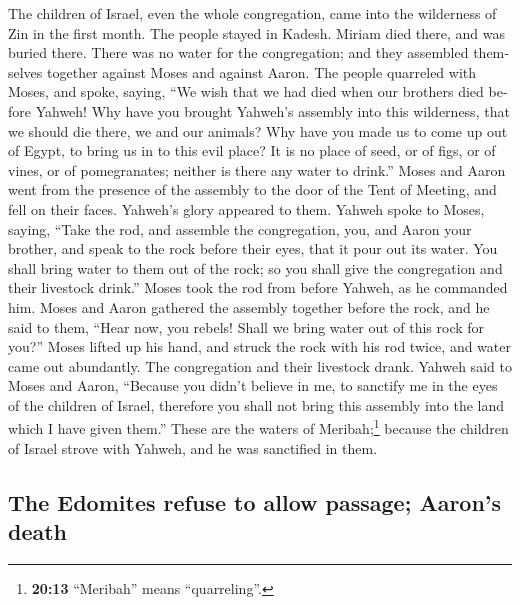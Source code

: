 \begin{paracol}{2}
\begin{otherlanguage}{english}
 The children of Israel, even the whole congregation, came
into the wilderness of Zin in the first month. The people stayed in
Kadesh. Miriam died there, and was buried there.  There
was no water for the congregation; and they assembled themselves
together against Moses and against Aaron.  The people
quarreled with Moses, and spoke, saying, ``We wish that we had died when
our brothers died before Yahweh!  Why have you brought
Yahweh's assembly into this wilderness, that we should die there, we and
our animals?  Why have you made us to come up out of
Egypt, to bring us in to this evil place? It is no place of seed, or of
figs, or of vines, or of pomegranates; neither is there any water to
drink.''  Moses and Aaron went from the presence of the
assembly to the door of the Tent of Meeting, and fell on their faces.
Yahweh's glory appeared to them.  Yahweh spoke to Moses,
saying,  ``Take the rod, and assemble the congregation,
you, and Aaron your brother, and speak to the rock before their eyes,
that it pour out its water. You shall bring water to them out of the
rock; so you shall give the congregation and their livestock drink.''
 Moses took the rod from before Yahweh, as he commanded
him.  Moses and Aaron gathered the assembly together
before the rock, and he said to them, ``Hear now, you rebels! Shall we
bring water out of this rock for you?''  Moses lifted up
his hand, and struck the rock with his rod twice, and water came out
abundantly. The congregation and their livestock drank. 
Yahweh said to Moses and Aaron, ``Because you didn't believe in me, to
sanctify me in the eyes of the children of Israel, therefore you shall
not bring this assembly into the land which I have given them.''
 These are the waters of Meribah;\footnote{\textbf{20:13}
  ``Meribah'' means ``quarreling''.} because the children of Israel
strove with Yahweh, and he was sanctified in them.

\hypertarget{the-edomites-refuse-to-allow-passage-aarons-death}{%
\subsection{The Edomites refuse to allow passage; Aaron's
death}\label{the-edomites-refuse-to-allow-passage-aarons-death}}


\end{otherlanguage}
\end{paracol}
